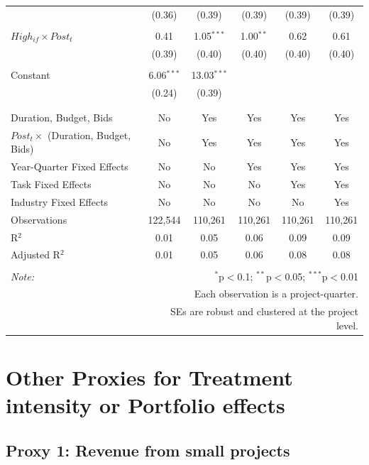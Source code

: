 \documentclass[
]{article}
\begin{document}
\begin{table}[H]
\begin{tabular}{@{\extracolsep{-2pt}}lccccc}
  & (0.36) & (0.39) & (0.39) & (0.39) & (0.39) \\ 
  & & & & & \\ 
 $High_{if} \times Post_t$ & 0.41 & 1.05$^{***}$ & 1.00$^{**}$ & 0.62 & 0.61 \\ 
  & (0.39) & (0.40) & (0.40) & (0.40) & (0.40) \\ 
  & & & & & \\ 
 Constant & 6.06$^{***}$ & 13.03$^{***}$ &  &  &  \\ 
  & (0.24) & (0.39) &  &  &  \\ 
  & & & & & \\ 
\hline \\[-1.8ex] 
Duration, Budget, Bids & No & Yes & Yes & Yes & Yes \\ 
$Post_t \times$  (Duration, Budget, Bids) & No & Yes & Yes & Yes & Yes \\ 
Year-Quarter Fixed Effects & No & No & Yes & Yes & Yes \\ 
Task Fixed Effects & No & No & No & Yes & Yes \\ 
Industry Fixed Effects & No & No & No & No & Yes \\ 
Observations & 122,544 & 110,261 & 110,261 & 110,261 & 110,261 \\ 
R$^{2}$ & 0.01 & 0.05 & 0.06 & 0.09 & 0.09 \\ 
Adjusted R$^{2}$ & 0.01 & 0.05 & 0.06 & 0.08 & 0.08 \\ 
\hline 
\hline \\[-1.8ex] 
\textit{Note:}  & \multicolumn{5}{r}{$^{*}$p$<$0.1; $^{**}$p$<$0.05; $^{***}$p$<$0.01} \\ 
 & \multicolumn{5}{r}{Each observation is a project-quarter.} \\ 
 & \multicolumn{5}{r}{SEs are robust and clustered at the project level.} \\ 
\end{tabular} 
\end{table}

\hypertarget{other-proxies-for-treatment-intensity-or-portfolio-effects}{%
\section{Other Proxies for Treatment intensity or Portfolio
effects}\label{other-proxies-for-treatment-intensity-or-portfolio-effects}}

\hypertarget{proxy-1-revenue-from-small-projects}{%
\subsection{Proxy 1: Revenue from small
projects}\label{proxy-1-revenue-from-small-projects}}
\end{document}
